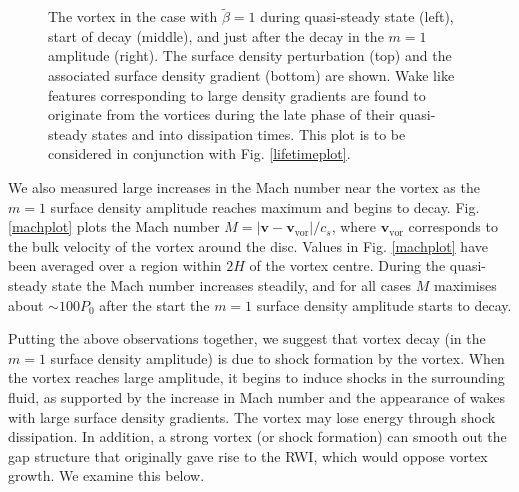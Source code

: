 \begin{figure}
{  }
  \hfill
  \caption{The vortex in the case with $\tilde{\beta}=1$
    during quasi-steady state (left), start of decay 
    (middle), and just after the decay in the $m=1$ amplitude
    (right). The surface density perturbation
    (top) and the associated surface density gradient (bottom) are
    shown. Wake like features corresponding to large density gradients
    are found to originate from the vortices during the late phase of 
    their quasi-steady states and into dissipation times.
    This plot is to be considered in conjunction with
    Fig. \ref{lifetimeplot}. 
    \label{shockplot}}
\end{figure}

We also measured large increases in the Mach number near
the vortex as the $m=1$ surface density amplitude reaches maximum and begins to decay. 
Fig. \ref{machplot} plots the Mach number $M=|\bm{v} -
\bm{v}_\mathrm{vor}|/c_s$, where 
$\bm{v}_\mathrm{vor}$ corresponds to the bulk velocity of the vortex
around the disc. Values in Fig. \ref{machplot} have been averaged over
a region within $2H$ of the vortex centre. 
During the quasi-steady state the Mach number increases 
steadily, and for all cases $M$ maximises about
$\sim 100P_0$ after the start the $m=1$ surface density
amplitude starts to decay. 

Putting the above observations together, we suggest that vortex decay
(in the $m=1$ surface density amplitude) is due to shock formation by
the vortex. When the vortex reaches large amplitude, it begins
to induce shocks in the surrounding fluid, as supported by the
increase in Mach number and the appearance of wakes with large surface
density gradients. The vortex may lose energy through shock
dissipation. In addition, a strong vortex (or shock formation) 
can smooth out the gap structure that originally gave rise to the
RWI, which would oppose vortex growth. We examine this below.


